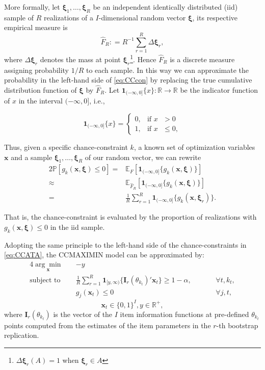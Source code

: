 More formally, let $\boldsymbol{\xi}_1, \ldots, \boldsymbol{\xi}_R$ be an independent identically distributed (iid) sample of $R$ realizations of a $I$-dimensional random vector $\boldsymbol{\xi}$, its respective empirical measure is 
$$\hat{F}_R : = R^{-1} \sum_{r=1}^R \Delta\boldsymbol{\xi}_r,$$
 where $\Delta\boldsymbol{\xi}_r$ denotes the mass at point $\boldsymbol{\xi}_r$\footnote{$\Delta\boldsymbol{\xi}_r(A)=1$ when $\boldsymbol{\xi}_r\in A$}. Hence $\hat{F}_R$ is a discrete measure assigning probability $1/R$ to each sample. In this way we can approximate the probability in the left-hand side of \eqref{eq:CCcon} by replacing the true cumulative distribution function of $\boldsymbol{\xi}$ by $\hat{F}_R$. 
 Let $\mathbf{1}_{(-\infty, 0]}\{x\} :\mathbb{R} \rightarrow \mathbb{R}$ be the indicator function of $x$ in the interval $(-\infty, 0]$, i.e.,
 

 	$$\mathbf{1}_{(-\infty, 0]}\{x\}= 
 	\begin{cases} 
 	0, & \mbox{if } x\mbox{ $> 0$} \\
 	1, & \mbox{if } x\mbox{ $\leq 0$},
 	\end{cases}
$$

Thus, given a specific chance-constraint $k$, a known set of optimization variables $\mathbf{x}$ and a sample $\boldsymbol{\xi}_1, \ldots, \boldsymbol{\xi}_R$ of our random vector, we can rewrite
\begin{alignat}{2}
\mathbb{P}\left[g_k(\mathbf{x},\boldsymbol{\xi})\leq 0\right] = &  \mathbb{E}_{F}\left[\mathbf{1}_{(-\infty, 0]}\{g_k(\mathbf{x},\boldsymbol{\xi})\} \right]\\
\approx & \mathbb{E}_{\hat{F}_R}\left[\mathbf{1}_{(-\infty, 0]}\{g_k(\mathbf{x},\boldsymbol{\xi})\} \right] \\
= & \frac{1}{R} \sum_{r=1}^R \mathbf{1}_{(-\infty, 0]}\{ g_k(\mathbf{x},\boldsymbol{\xi}_r) \}.
\end{alignat}

That is, the chance-constraint is evaluated by the proportion of realizations with $g_k(\mathbf{x},\boldsymbol{\xi}) \leq 0$ in the iid sample.

Adopting the same principle to the left-hand side of the chance-constraints in \eqref{eq:CCATA}, the CCMAXIMIN model can be approximated by:
\begin{alignat}{4}\label{eq:CCMAXIMINapprox}
\underset{\mathbf{x}}{\arg \min} \quad & -y &&\quad  & \\
\nonumber
\text{subject to} \quad &\frac{1}{R}\sum_{r=1}^R\mathbf{1}_{[y,\infty)}\{ \mathbf{I}_r(\theta_{k_t})'\mathbf{x}_t \} \geq 1-\alpha ,  &&\quad & \forall t,k_t,\\\nonumber
& g_j(\mathbf{x}_t) \leq 0 &&\quad & \forall j,t,
\end{alignat}
\begin{equation}\nonumber
\mathbf{x}_t \in \{0,1\}^I, y \in \mathbb{R}^+,
\end{equation}
where $\mathbf{I}_{r}(\theta_{k_t})$ is the vector of the $I$ item information functions at pre-defined $\theta_{k_t}$ points computed from the estimates of the item parameters in the $r$-th bootstrap replication. 

